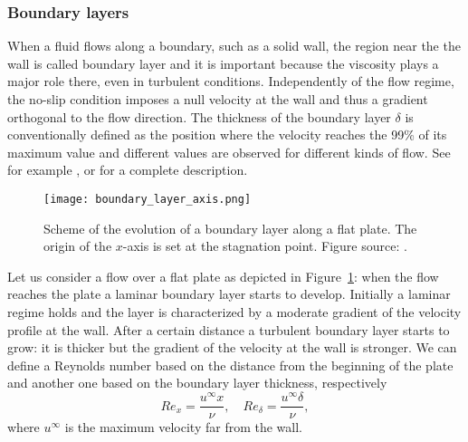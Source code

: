 \subsubsection{Boundary layers} \label{subsec:bl}
When a fluid flows along a boundary, such as a solid wall, the region near the 
the wall is called boundary layer and it is important because the 
viscosity plays a major role there, even in turbulent conditions.
Independently of the flow regime, the no-slip condition imposes a null velocity 
at the wall and thus a gradient orthogonal to the flow direction. The thickness 
of the boundary layer $\delta$ is conventionally defined as the position where 
the velocity reaches the 99\% of its maximum value and different values are observed for 
different kinds of flow.  See for example \cite{bl:schlichting}, \cite{main:pope} or \cite{main:davidson} for a complete description.

\begin{figure}
	\centering
	\texttt{[image: boundary\_layer\_axis.png]}
	\caption[Boundary layer along a flat plate]{Scheme of the evolution of a 
	boundary layer along a flat plate. The origin of the $x$-axis is set at the stagnation point. Figure source: \cite{tesi:fetzer}.}
	\label{fig:bl}
\end{figure}
Let us consider a flow over a flat plate as depicted in Figure~\ref{fig:bl}: when 
the flow reaches the plate a laminar boundary layer starts to develop. Initially a laminar regime holds and the layer is characterized by a moderate gradient of the 
velocity profile at the wall. After a certain distance a turbulent boundary 
layer starts to grow: it is thicker but the gradient of the velocity at the 
wall is stronger. We can define a Reynolds number based on the distance from 
the beginning of the plate and another one based on the boundary layer 
thickness, respectively
\begin{equation}
Re_x = \frac{u^\infty x}{\nu}, \quad Re_\delta = \frac{u^\infty 
	\delta}{\nu},
\end{equation}
where $u^\infty$ is the maximum velocity far from the wall.

